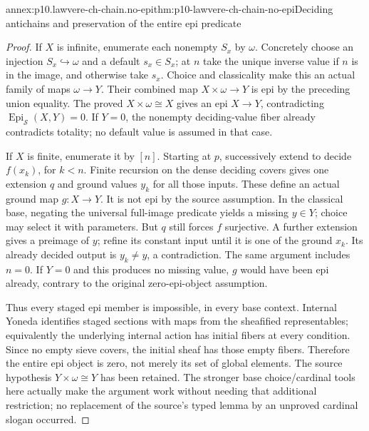 \begin{annexitem}{annex:p10.lawvere-ch-chain.no-epi}{thm:p10-lawvere-ch-chain-no-epi}{Deciding antichains and preservation of the entire epi predicate}
\begin{proof}
If \(X\) is infinite, enumerate each nonempty \(S_x\) by \(\omega\).
Concretely choose an injection \(S_x\hookrightarrow\omega\) and a
default \(s_x\in S_x\); at \(n\) take the unique inverse value if \(n\)
is in the image, and otherwise take \(s_x\). Choice and classicality
make this an actual family of maps \(\omega\to Y\).
Their combined map \(X\times\omega\to Y\) is epi by the preceding
union equality. The proved \(X\times\omega\cong X\) gives an epi
\(X\to Y\), contradicting \(\operatorname{Epi}_{\mathcal S}(X,Y)=0\).
If \(Y=0\), the nonempty deciding-value fiber already contradicts
totality; no default value is assumed in that case.

If \(X\) is finite, enumerate it by \([n]\). Starting at \(p\),
successively extend to decide \(f(x_k)\), for \(k<n\). Finite recursion
on the dense deciding covers gives one extension \(q\) and ground values
\(y_k\) for all those inputs. These define an actual ground map
\(g:X\to Y\). It is not epi by the source assumption. In the
classical base, negating the universal full-image predicate yields a
missing \(y\in Y\); choice may select it with parameters.
But \(q\) still forces \(f\) surjective. A further extension gives a
preimage of \(y\); refine its constant input until it is one of the
ground \(x_k\). Its already decided output is \(y_k\ne y\), a
contradiction. The same argument includes \(n=0\). If \(Y=0\) and
this produces no missing value, \(g\) would have been epi already,
contrary to the original zero-epi-object assumption.

Thus every staged epi member is impossible, in every base context.
Internal Yoneda identifies staged sections with maps from the
sheafified representables; equivalently the underlying internal action
has initial fibers at every condition. Since no empty sieve covers,
the initial sheaf has those empty fibers. Therefore the entire epi
object is zero, not merely its set of global elements.
The source hypothesis \(Y\times\omega\cong Y\) has been retained.
The stronger base choice/cardinal tools here actually make the argument
work without needing that additional restriction; no replacement of
the source's typed lemma by an unproved cardinal slogan occurred.
\end{proof}
\end{annexitem}

